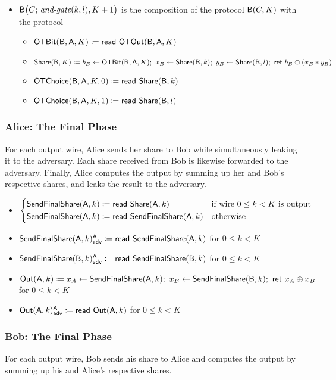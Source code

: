 \begin{itemize}
\item $\mathsf{B}\big(C; \, \textit{and-gate}(k,l),K+1\big)$ is the composition of the protocol $\mathsf{B}(C,K)$ with the protocol
\begin{itemize}
\item $\mathsf{OTBit}(\mathsf{B},\mathsf{A},K) \coloneqq \mathsf{read} \ \mathsf{OTOut}(\mathsf{B},\mathsf{A},K)$\smallskip
\item $\mathsf{Share}(\mathsf{B},K) \coloneqq b_B \leftarrow \mathsf{OTBit}(\mathsf{B},\mathsf{A},K); \ x_B \leftarrow \mathsf{Share}(\mathsf{B},k); \ y_B \leftarrow \mathsf{Share}(\mathsf{B},l); \ \mathsf{ret} \ b_B \oplus (x_B * y_B)$\smallskip
\item $\mathsf{OTChoice}(\mathsf{B},\mathsf{A},K,0) \coloneqq \mathsf{read} \ \mathsf{Share}(\mathsf{B},k)$
\item $\mathsf{OTChoice}(\mathsf{B},\mathsf{A},K,1) \coloneqq \mathsf{read} \ \mathsf{Share}(\mathsf{B},l)$
\end{itemize}
\end{itemize}

\subsubsection{Alice: The Final Phase}
For each output wire, Alice sends her share to Bob while simultaneously leaking it to the adversary. Each share received from Bob is likewise forwarded to the adversary. Finally, Alice computes the output by summing up her and Bob's respective shares, and leaks the result to the adversary.

\begin{itemize}
\item $\begin{cases*} \SendFinalShare(\A,k) \coloneqq \read{\Share(\A,k)} & \text{if wire $0 \leq k < K$ is output} \\ \SendFinalShare(\A,k) \coloneqq \read{\SendFinalShare(\A,k)} & \text{otherwise} \end{cases*}$
\item {\color{blue} $\mathsf{SendFinalShare}(\mathsf{A},k)^{\mathsf{A}}_{\mathsf{adv}} \coloneqq \mathsf{read} \ \mathsf{SendFinalShare}(\mathsf{A},k)$ for $0 \leq k < K$}
\item {\color{blue} $\mathsf{SendFinalShare}(\mathsf{B},k)^{\mathsf{A}}_{\mathsf{adv}} \coloneqq \mathsf{read} \ \mathsf{SendFinalShare}(\mathsf{B},k)$ for $0 \leq k < K$}
\item $\Out(\A,k) \coloneqq x_A \leftarrow \SendFinalShare(\A,k); \ x_B \leftarrow \SendFinalShare(\B,k); \ \ret{x_A \oplus x_B}$ for $0 \leq k < K$
\item {\color{blue} $\mathsf{Out}(\mathsf{A},k)^{\mathsf{A}}_{\mathsf{adv}} \coloneqq \mathsf{read} \ \mathsf{Out}(\mathsf{A},k)$ for $0 \leq k < K$}
\end{itemize}

\subsubsection{Bob: The Final Phase}
For each output wire, Bob sends his share to Alice and computes the output by summing up his and Alice's respective shares.

